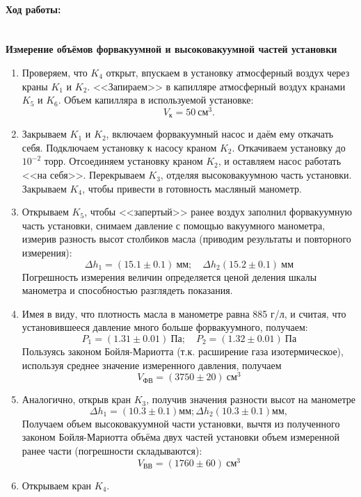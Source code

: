 \documentclass[a4paper, 12pt]{article}
\newcommand{\parag}[1]{\paragraph*{#1:}}
\begin{document}
\parag {Ход работы} ~\\
\textbf{Измерение объёмов форвакуумной и высоковакуумной частей установки}
	\begin{enumerate}
		\item Проверяем, что $K_4$ открыт, впускаем в установку атмосферный воздух через краны $K_1$ и $K_2$. <<Запираем>> в капилляре атмосферный воздух кранами $K_5$ и $K_6$. Объем капилляра в используемой установке: $$V_\text{к} = 50~ \text{см}^3.$$
		\item Закрываем $K_1$ и $K_2$, включаем форвакуумный насос и даём ему откачать себя. Подключаем установку к насосу краном $K_2$. Откачиваем установку до $10^{-2}$ торр. Отсоединяем установку краном $K_2$, и оставляем насос работать <<на себя>>. Перекрываем  $K_3$, отделяя высоковакуумною часть установки. Закрываем  $K_4$, чтобы привести в готовность масляный манометр.
		\item Открываем  $K_5$, чтобы <<запертый>> ранее воздух заполнил форвакуумную часть установки, снимаем давление с помощью вакуумного манометра, измерив разность высот столбиков масла (приводим результаты и повторного измерения):
		$$
		\Delta h_1 = (15.1\pm0.1) ~\text{мм};\quad \Delta h_2 (15.2\pm0.1) ~\text{мм}
		$$
		Погрешность измерения величин определяется ценой деления шкалы манометра и способностью разглядеть показания.
		\item Имея в виду, что плотность масла в манометре равна 885 г/л, и считая, что установившееся давление много больше форвакуумного, получаем:
		$$
		P_1 = (1.31\pm0.01)~\text{Па};\quad P_2 = (1.32\pm0.01)~\text{Па}
		$$
		Пользуясь законом Бойля-Мариотта (т.к. расширение газа изотермическое), используя среднее значение измеренного давления, получаем
		$$
		V_\text{ФВ} = (3750\pm20)~\text{см}^3
		$$
		\item Аналогично, открыв кран $K_3$, получив значения разности высот на манометре
		$$
		\Delta h_1 = (10.3\pm0.1) \text{мм}; \Delta h_2 (10.3\pm0.1) \text{мм},
		$$
		Получаем объем высоковакуумной части установки, вычтя из полученного законом Бойля-Мариотта объёма двух частей установки объем измеренной ранее части (погрешности складываются):
		$$
		V_\text{ВВ} = (1760\pm60)~\text{см}^3
		$$
		\item Открываем кран $K_4$.
	\end{enumerate}
\end{document}
